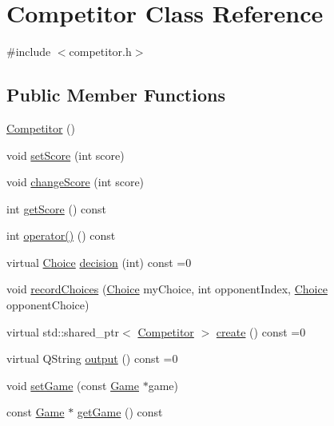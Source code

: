 \hypertarget{class_competitor}{
\section{Competitor Class Reference}
\label{class_competitor}
}


{\ttfamily \#include $<$competitor.h$>$}

\subsection*{Public Member Functions}
\begin{DoxyCompactItemize}
\item 
\hyperlink{class_competitor_a5b0be053c08542f9045215bc05c12707}{Competitor} ()
\item 
void \hyperlink{class_competitor_a45ad2007c3c4e7a4cb357e06a6908798}{setScore} (int score)
\item 
void \hyperlink{class_competitor_a23b5160639023a94838ef9ca53ee7a0a}{changeScore} (int score)
\item 
int \hyperlink{class_competitor_a220a68f1c178ae450f9da323bdcb96c3}{getScore} () const 
\item 
int \hyperlink{class_competitor_af0043c95a62cda09709955fbf1c82d36}{operator()} () const 
\item 
virtual \hyperlink{competitor_8h_ac5102e0b11ce43d0b9ef595c3c3ab0c3}{Choice} \hyperlink{class_competitor_a7fdb973100dff4daf285a64c13a48a00}{decision} (int) const =0
\item 
void \hyperlink{class_competitor_a12f192143061f0a5731609d3ae0f23fe}{recordChoices} (\hyperlink{competitor_8h_ac5102e0b11ce43d0b9ef595c3c3ab0c3}{Choice} myChoice, int opponentIndex, \hyperlink{competitor_8h_ac5102e0b11ce43d0b9ef595c3c3ab0c3}{Choice} opponentChoice)
\item 
virtual std::shared\_\-ptr$<$ \hyperlink{class_competitor}{Competitor} $>$ \hyperlink{class_competitor_af1ffcede24dd20addc07e135d2296643}{create} () const =0
\item 
virtual QString \hyperlink{class_competitor_a0d0a61ade9202c7bea838280285e2d22}{output} () const =0
\item 
void \hyperlink{class_competitor_a79d4066219d5d7a8fe2ed091bf65e91e}{setGame} (const \hyperlink{class_game}{Game} $\ast$game)
\item 
const \hyperlink{class_game}{Game} $\ast$ \hyperlink{class_competitor_a6e8290650be5c957a975673a8d8a666c}{getGame} () const 
\end{DoxyCompactItemize}
